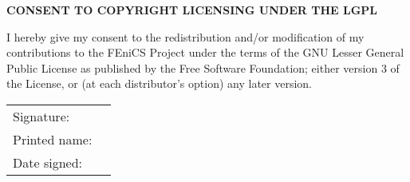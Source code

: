 \documentclass[11pt]{article}
\begin{document}
\pagestyle{empty}

\large

\begin{center}
  \textbf{CONSENT TO COPYRIGHT LICENSING UNDER THE LGPL}
\end{center}

\normalsize

\vspace{1cm}

I hereby give my consent to the redistribution and/or modification of
my contributions to the FEniCS Project\footnotemark{} under the terms of
the GNU Lesser General Public License as published by the Free
Software Foundation; either version 3 of the License, or (at each
distributor's option) any later version.

\vspace{2cm}

\begin{tabular}{ll}
Signature:     & \underline{\hspace{9cm}} \\[2cm]
Printed name:  & \underline{\hspace{9cm}} \\[2cm]
Date signed:   & \underline{\hspace{9cm}}
\end{tabular}


\end{document}
